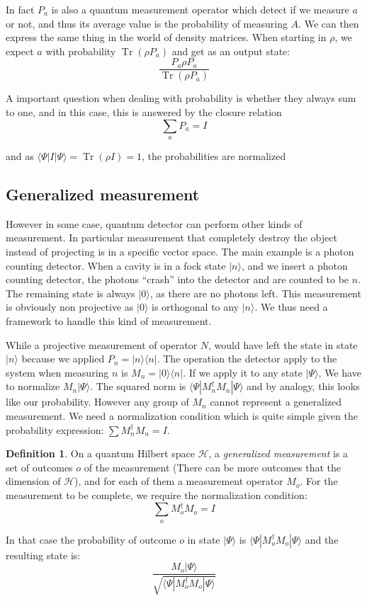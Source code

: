 \documentclass[10pt,a4paper]{report}
\theoremstyle{plain}
\theoremstyle{definition}
\newtheorem{defn}{Definition}[chapter]
\theoremstyle{remark}
\newcommand{\ket}[1]{|#1\rangle}
\newcommand{\bra}[1]{\langle#1|}
\DeclareMathOperator{\Tr}{Tr}
\begin{document}
In fact $P_a$ is also a quantum measurement operator which detect if we measure
$a$ or not, and thus its average value is the probability of measuring $A$. We
can then express the same thing in the world of density matrices. When starting in
$\rho$, we expect $a$ with probability $\Tr(\rho P_a)$ and get as an output
state:
\[ \frac{P_a \rho P_a}{\Tr(\rho P_a)}\]

A important question when dealing with probability is whether they always sum to
one, and in this case, this is answered by the closure relation
\[\sum_a P_a = I\]

and as $\bra \Psi I \ket \Psi = \Tr(\rho I) = 1$, the probabilities are normalized

\subsection{Generalized measurement}

However in some case, quantum detector can perform other kinds of measurement.
In particular measurement that completely destroy the object instead of
projecting is in a specific vector space. The main example is a photon counting
detector. When a cavity is in a fock state $\ket n$, and we insert a photon
counting detector, the photons ``crash'' into the detector and are counted to be
$n$. The remaining state is always $\ket 0$, as there are no photons left. This
measurement is obviously non projective as $\ket 0$ is orthogonal to any $\ket
n$. We thus need a framework to handle this kind of measurement.

While a projective measurement of operator $N$, would have left the state in
state $\ket n$ because we applied $P_n = \ket n \bra n$.
The operation the detector apply to the system when measuring $n$ is $M_n = \ket
0 \bra n$. If we apply it to any state $\ket \Psi$, We have to normalize $M_n
\ket \Psi$. The squared norm is $\bra \Psi M_n^\dagger M_n \ket \Psi$ and by
analogy, this looks like our probability. However any group of $M_n$ cannot
represent a generalized measurement. We need a normalization condition which is
quite simple given the probability expression: $\sum M_n^\dagger M_n = I$.

\begin{defn}
  On a quantum Hilbert space $\mathcal{H}$, a \emph{generalized measurement} is a set
  of outcomes $o$ of the measurement (There can be more outcomes that the
  dimension of $\mathcal{H}$), and for each of them a measurement
  operator $M_o$. For the measurement to be complete, we require the
  normalization condition:
  \[\sum_o M_o^\dagger M_o = I\]

  In that case the probability of outcome $o$ in state $\ket \Psi$ is $\bra \Psi
  M_o^\dagger M_o \ket \Psi$ and the resulting state is:
\[\frac{M_o \ket \Psi}{\sqrt{\bra \Psi M_o^\dagger M_o \ket \Psi}}\]
\end{defn}
\end{document}
